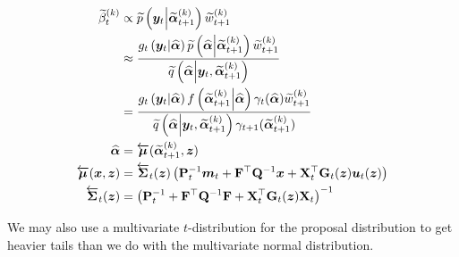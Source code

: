 \documentclass[notitlepage]{article}
\renewcommand{\vec}[1]{\bm{#1}}
\newcommand{\vecLarrow}[1]{\overleftarrow{\vec{#1}}}
\newcommand{\mat}[1]{\mathbf{#1}}
\newcommand{\matLarrow}[1]{\overleftarrow{\mat{#1}}}
\newcommand{\Lparen}[1]{\left( #1\right)}
\newcommand{\Cond}[2]{ #1 \middle\vert  #2}
\newcommand{\optor}[2]{#1\Lparen{#2}}
\newcommand{\optorC}[3]{\optor{#1}{\Cond{#2}{#3}}}
\newcommand{\pdenstC}[2]{\optorC{\widetilde p}{#1}{#2}}
\newcommand{\IDAproxC}[2]{\optorC{\widetilde{q}}{#1}{#2}}
\newcommand{\particB}[3]{\widetilde{#1}_{#2}^{\Lparen{#3}}}
\begin{document}
\begin{align}
\particB{\beta}{t}{k} &\propto %
		\pdenstC{\vec{y}_t}{\particB{\vec\alpha}{t + 1}k}
		\particB w{t + 1}k\nonumber\\
	&\approx \frac{ %
		\optorC{g_t}{\vec{y}_t}{\widehat{\vec\alpha}}
		\pdenstC{\widehat{\vec\alpha}}{\particB{\vec{\alpha}}{t + 1}k}
		\particB w{t + 1}k
	}{%
		\IDAproxC{\widehat{\vec\alpha}}{\vec y_t, 
			\particB{\vec{\alpha}}{t + 1}k}
	}\nonumber\\
&= \frac{ %
		\optorC{g_t}{\vec{y}_t}{\widehat{\vec\alpha}}
		\optorC{f}{\particB{\vec{\alpha}}{t + 1}k}{\widehat{\vec\alpha}}
		\gamma_t(\widehat{\vec\alpha})
		\particB w{t + 1}k
	}{%
		\IDAproxC{\widehat{\vec\alpha}}{\vec y_t, 
			\particB{\vec{\alpha}}{t + 1}k}
		\gamma_{t+1}(\particB{\vec{\alpha}}{t + 1}k)
	}\label{eq:bwResampleW}\\
\widehat{\vec\alpha} &= 
	\vecLarrow\mu (\particB{\vec{\alpha}}{t + 1}k, \vec z)\nonumber\\
\vecLarrow\mu (\vec x, \vec z)
	&= \matLarrow\Sigma_t(\vec z)\Lparen{
	\mat P_t^{-1}\vec m_t + \mat F^\top \mat Q^{-1}\vec x + 
	\mat X_t^\top\mat G_t(\vec z)\vec u_t(\vec z)} \label{eq:bwPropBackMean}\\
\matLarrow\Sigma_t(\vec z) &= 
	\Lparen{\mat P_t^{-1} + \mat F^\top\mat Q^{-1}\mat F + 
		\mat X_t^\top \mat G_t(\vec z) \mat X_t}^{-1} \label{eq:bwPropBackCov} 
\end{align}

We may also use a multivariate $t$-distribution for the proposal distribution to get heavier
tails than we do with the multivariate normal distribution.
\end{document}
